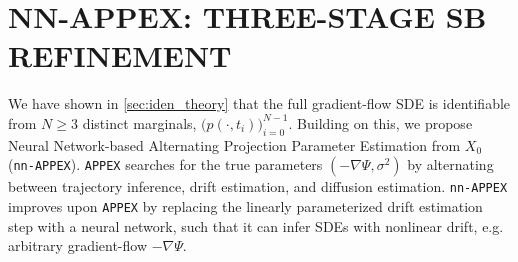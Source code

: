 \documentclass[twoside]{article}
\newcommand{\Ti} {\mathbb T}
\newcommand{\nappex}{\texttt{nn-APPEX}}
\newcommand{\appex}{\texttt{APPEX}}
\newcommand{\wot}{\texttt{WOT}}
\newcommand{\sbirr}{\texttt{SBIRR}}
\begin{document}





\section{NN-APPEX: THREE-STAGE SB REFINEMENT}
\label{sec:method}
We have shown in \cref{sec:iden_theory} that the full gradient-flow SDE is identifiable from $N \ge 3$ distinct marginals, $\bigl(p(\cdot, t_i)\bigr)_{i=0}^{N-1}$. Building on this, we propose Neural Network-based Alternating Projection Parameter Estimation from $X_0$ (\nappex). \appex{} searches for the true parameters $(-\nabla \Psi, \sigma^2)$ by alternating between trajectory inference, drift estimation, and diffusion estimation. \nappex{} improves upon \appex{} \citep{guan2024identifying} by replacing the linearly parameterized drift estimation step with a neural network, such that it can infer SDEs with nonlinear drift, e.g. arbitrary gradient-flow $-\nabla \Psi$.


\end{document}
